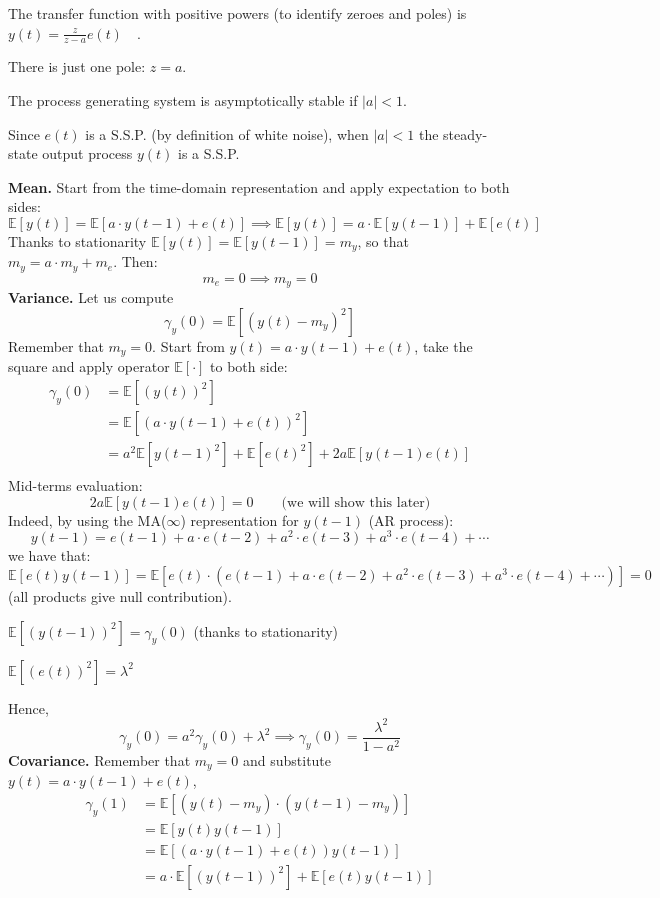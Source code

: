 The transfer function with positive powers (to identify zeroes and poles) is $y(t)=\frac{z}{z-a} e(t) \quad$.

There is just one pole: $z=a .$

The process generating system is asymptotically stable if $|a| <1$. 

Since $e(t)$ is a S.S.P. (by definition of white noise), when $|a| <1$ the steady-state output process $y(t)$ is a S.S.P.

\textbf{Mean.}
Start from the time-domain representation and apply expectation to both sides:
\[
	\mathbb{E}[y(t)]=\mathbb{E}[a \cdot y(t-1)+e(t)] \implies \mathbb{E}[y(t)]=a \cdot \mathbb{E}[y(t-1)]+\mathbb{E}[e(t)]
\]
Thanks to stationarity $\mathbb{E}[y(t)]=\mathbb{E}[y(t-1)]=m_{y}$, so that $m_{y}=a \cdot m_{y}+m_{e}$.
Then:
$$
m_{e}=0 \implies  m_{y}=0
$$
\textbf{Variance.}
Let us compute
\[
	\gamma_{y}(0)=\mathbb{E}\left[\left(y(t)-m_{y}\right)^{2}\right]
\]
Remember that $m_{y}=0$. Start from $y(t)=a \cdot y(t-1)+e(t)$, take the square and apply operator $\mathbb{E}[\cdot]$ to both side:
\begin{align*}
	\gamma_{y}(0)&=\mathbb{E}\left[(y(t))^{2}\right]\\
	&=\mathbb{E}\left[(a \cdot y(t-1)+e(t))^{2}\right]\\
	&=a^{2} \mathbb{E}\left[y(t-1)^{2}\right]+\mathbb{E}\left[e(t)^{2}\right]+2 a \mathbb{E}[y(t-1) e(t)]\\
\end{align*}
Mid-terms evaluation:
\[
	2 a \mathbb{E}[y(t-1) e(t)]=0 \qquad \text{(we will show this later)}
\]
Indeed, by using the MA($\infty$) representation for $y(t-1)$ (AR process):
$$
y(t-1)=e(t-1)+a \cdot e(t-2)+a^{2} \cdot e(t-3)+a^{3} \cdot e(t-4)+\cdots
$$
we have that:
\[
	\mathbb{E}[e(t) y(t-1)]=\mathbb{E}\left[e(t) \cdot\left(e(t-1)+a \cdot e(t-2)+a^{2} \cdot e(t-3)+a^{3} \cdot e(t-4)+\cdots\right)\right]=0
\]
(all products give null contribution).


$\mathbb{E}\left[(y(t-1))^{2}\right]=\gamma_{y}(0)$ (thanks to stationarity)

$\mathbb{E}\left[(e(t))^{2}\right]=\lambda^{2}$

Hence,
\[
	\gamma_{y}(0)=a^{2} \gamma_{y}(0)+\lambda^{2} \implies \gamma_{y}(0)=\frac{\lambda^{2}}{1-a^{2}}
\]
\textbf{Covariance.}
Remember that $m_{y}=0$ and substitute $y(t)=a \cdot y(t-1)+e(t)$,
\begin{align*}
	\gamma_{y}(1)&=\mathbb{E}\left[\left(y(t)-m_{y}\right) \cdot\left(y(t-1)-m_{y}\right)\right]\\
	&=\mathbb{E}[y(t) y(t-1)]\\
	&=\mathbb{E}[(a \cdot y(t-1)+e(t))y(t-1)]\\
	&=a \cdot \mathbb{E}\left[(y(t-1))^{2}\right]+\mathbb{E}[e(t) y(t-1)]
\end{align*}

